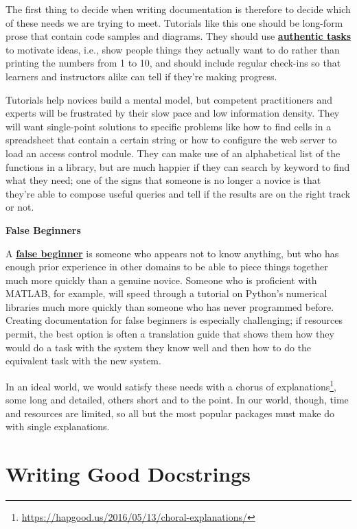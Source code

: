 \documentclass[
]{krantz}
\renewenvironment{quote}{\begin{VF}}{\end{VF}}
\renewcommand{\href}[2]{#2\footnote{\url{#1}}}
\newcommand{\gref}[2]{\hyperlink{#2}{\textbf{#1}}}
\begin{document}
The first thing to decide when writing documentation
is therefore to decide which of these needs we are trying to meet.
Tutorials like this one should be long-form prose that contain code samples and diagrams.
They should use \gref{authentic tasks}{authentic\_task} to motivate ideas,
i.e.,
show people things they actually want to do rather than printing the numbers from 1 to 10,
and should include regular check-ins
so that learners and instructors alike can tell if they're making progress.

Tutorials help novices build a mental model,
but competent practitioners and experts will be frustrated by their slow pace and low information density.
They will want single-point solutions to specific problems like
how to find cells in a spreadsheet that contain a certain string
or how to configure the web server to load an access control module.
They can make use of an alphabetical list of the functions in a library,
but are much happier if they can search by keyword to find what they need;
one of the signs that someone is no longer a novice is that
they're able to compose useful queries and tell if the results are on the right track or not.

\begin{quote}
\textbf{False Beginners}

A \gref{false beginner}{false\_beginner} is someone who appears not to know anything,
but who has enough prior experience in other domains
to be able to piece things together much more quickly than a genuine novice.
Someone who is proficient with MATLAB, for example,
will speed through a tutorial on Python's numerical libraries
much more quickly than someone who has never programmed before.
Creating documentation for false beginners is especially challenging;
if resources permit,
the best option is often a translation guide
that shows them how they would do a task with the system they know well
and then how to do the equivalent task with the new system.
\end{quote}

In an ideal world,
we would satisfy these needs with a \href{https://hapgood.us/2016/05/13/choral-explanations/}{chorus of explanations},
some long and detailed,
others short and to the point.
In our world, though,
time and resources are limited,
so all but the most popular packages must make do with single explanations.

\hypertarget{documentation-docstrings}{%
\section{Writing Good Docstrings}\label{documentation-docstrings}}
\end{document}

